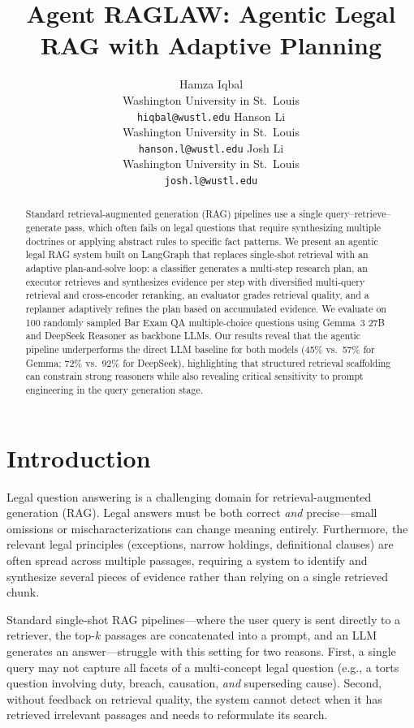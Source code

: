 \documentclass{article}
\title{Agent RAGLAW: Agentic Legal RAG with Adaptive Planning}
\author{%
  Hamza Iqbal \\
  Washington University in St.\ Louis \\
  \texttt{hiqbal@wustl.edu}
  \And
  Hanson Li \\
  Washington University in St.\ Louis \\
  \texttt{hanson.l@wustl.edu}
  \And
  Josh Li \\
  Washington University in St.\ Louis \\
  \texttt{josh.l@wustl.edu}
}
\begin{document}
\maketitle

\begin{abstract}
Standard retrieval-augmented generation (RAG) pipelines use a single query--retrieve--generate pass, which often fails on legal questions that require synthesizing multiple doctrines or applying abstract rules to specific fact patterns. We present an agentic legal RAG system built on LangGraph that replaces single-shot retrieval with an adaptive plan-and-solve loop: a classifier generates a multi-step research plan, an executor retrieves and synthesizes evidence per step with diversified multi-query retrieval and cross-encoder reranking, an evaluator grades retrieval quality, and a replanner adaptively refines the plan based on accumulated evidence. We evaluate on 100 randomly sampled Bar Exam QA multiple-choice questions using Gemma~3 27B and DeepSeek Reasoner as backbone LLMs. Our results reveal that the agentic pipeline underperforms the direct LLM baseline for both models (45\% vs.\ 57\% for Gemma; 72\% vs.\ 92\% for DeepSeek), highlighting that structured retrieval scaffolding can constrain strong reasoners while also revealing critical sensitivity to prompt engineering in the query generation stage.
\end{abstract}

\section{Introduction}

Legal question answering is a challenging domain for retrieval-augmented generation (RAG). Legal answers must be both correct \emph{and} precise---small omissions or mischaracterizations can change meaning entirely. Furthermore, the relevant legal principles (exceptions, narrow holdings, definitional clauses) are often spread across multiple passages, requiring a system to identify and synthesize several pieces of evidence rather than relying on a single retrieved chunk.

Standard single-shot RAG pipelines---where the user query is sent directly to a retriever, the top-$k$ passages are concatenated into a prompt, and an LLM generates an answer---struggle with this setting for two reasons. First, a single query may not capture all facets of a multi-concept legal question (e.g., a torts question involving duty, breach, causation, \emph{and} superseding cause). Second, without feedback on retrieval quality, the system cannot detect when it has retrieved irrelevant passages and needs to reformulate its search.
\end{document}
